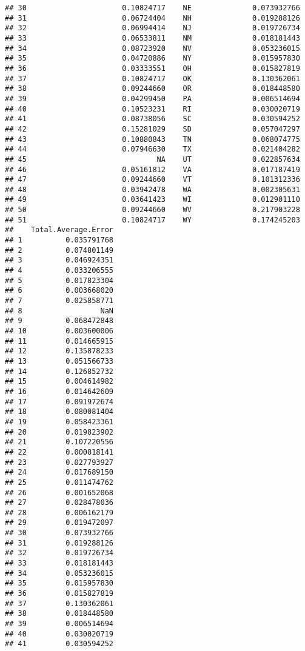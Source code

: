 \documentclass{article}\usepackage[]{graphicx}\usepackage[]{color}
\makeatletter
\newenvironment{kframe}{%
 \def\at@end@of@kframe{}%
 \ifinner\ifhmode%
  \def\at@end@of@kframe{\end{minipage}}%
  \begin{minipage}{\columnwidth}%
 \fi\fi%
 \def\FrameCommand##1{\hskip\@totalleftmargin \hskip-\fboxsep
 \colorbox{shadecolor}{##1}\hskip-\fboxsep
     \hskip-\linewidth \hskip-\@totalleftmargin \hskip\columnwidth}%
 \MakeFramed {\advance\hsize-\width
   \@totalleftmargin\z@ \linewidth\hsize
   \@setminipage}}%
 {\par\unskip\endMakeFramed%
 \at@end@of@kframe}
\newenvironment{knitrout}{}{} %
\makeatother
\begin{document}
\begin{knitrout}
\begin{kframe}
\begin{verbatim}
## 30                      0.10824717    NE              0.073932766
## 31                      0.06724404    NH              0.019288126
## 32                      0.06994414    NJ              0.019726734
## 33                      0.06533811    NM              0.018181443
## 34                      0.08723920    NV              0.053236015
## 35                      0.04720886    NY              0.015957830
## 36                      0.03333551    OH              0.015827819
## 37                      0.10824717    OK              0.130362061
## 38                      0.09244660    OR              0.018448580
## 39                      0.04299450    PA              0.006514694
## 40                      0.10523231    RI              0.030020719
## 41                      0.08738056    SC              0.030594252
## 42                      0.15281029    SD              0.057047297
## 43                      0.10880843    TN              0.068074775
## 44                      0.07946630    TX              0.021404282
## 45                              NA    UT              0.022857634
## 46                      0.05161812    VA              0.017187419
## 47                      0.09244660    VT              0.101312336
## 48                      0.03942478    WA              0.002305631
## 49                      0.03641423    WI              0.012901110
## 50                      0.09244660    WV              0.217903228
## 51                      0.10824717    WY              0.174245203
##    Total.Average.Error
## 1          0.035791768
## 2          0.074801149
## 3          0.046924351
## 4          0.033206555
## 5          0.017823304
## 6          0.003668020
## 7          0.025858771
## 8                  NaN
## 9          0.068472848
## 10         0.003600006
## 11         0.014665915
## 12         0.135878233
## 13         0.051566733
## 14         0.126852732
## 15         0.004614982
## 16         0.014642609
## 17         0.091972674
## 18         0.080081404
## 19         0.058423361
## 20         0.019823902
## 21         0.107220556
## 22         0.000818141
## 23         0.027793927
## 24         0.017689150
## 25         0.011474762
## 26         0.001652068
## 27         0.028478036
## 28         0.006162179
## 29         0.019472097
## 30         0.073932766
## 31         0.019288126
## 32         0.019726734
## 33         0.018181443
## 34         0.053236015
## 35         0.015957830
## 36         0.015827819
## 37         0.130362061
## 38         0.018448580
## 39         0.006514694
## 40         0.030020719
## 41         0.030594252

\end{verbatim}
\end{kframe}
\end{knitrout}
\end{document}
